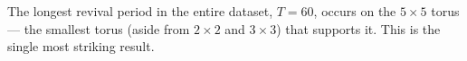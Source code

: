 The longest revival period in the entire dataset, $T=60$, occurs on the
$5 \times 5$ torus --- the smallest torus (aside from $2\times2$ and
$3\times3$) that supports it. This is the single most striking result.

